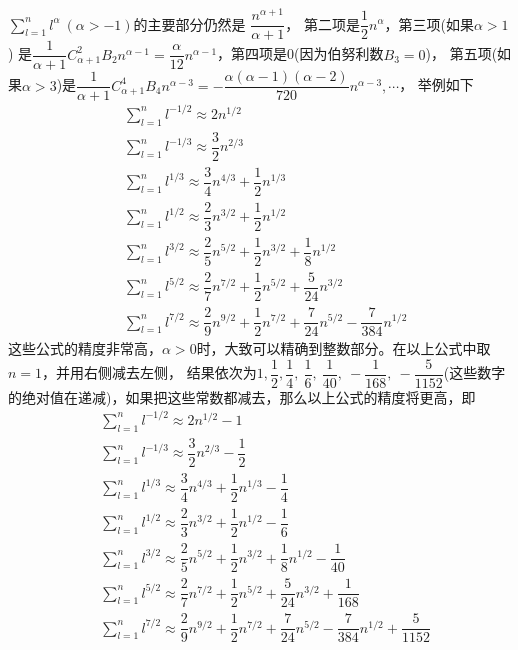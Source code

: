 \begin{itemize}[leftmargin=\inteval{\myitemleftmargin}pt,itemsep=
   \inteval{\myitemitempsep}pt,topsep=\inteval{\myitemtopsep}pt]
$ \sum\limits_{l=1}^{n} l^{\alpha}\ (\alpha>-1) $的主要部分仍然是
$ \dfrac{n^{\alpha+1}}{\alpha+1} $，
第二项是$ \dfrac{1}{2}n^{\alpha} $，第三项(如果$ \alpha>1 $)
是$ \dfrac{1}{\alpha+1}C_{\alpha+1}^2 B_2 n^{\alpha-1}=
\dfrac{\alpha}{12}n^{\alpha-1} $，第四项是0(因为伯努利数$ B_3=0 $)，
第五项(如果$ \alpha>3 $)是$ \dfrac{1}{\alpha+1}C_{\alpha+1}^4B_4n^{\alpha-3}
=-\dfrac{\alpha (\alpha-1)(\alpha-2)}{720}n^{\alpha-3},\cdots $，
举例如下
\begin{align*}
    &\sum\limits_{l=1}^{n} l^{-1/2}\approx 2n^{1/2}\\  
    &\sum\limits_{l=1}^{n} l^{-1/3}\approx \dfrac{3}{2}n^{2/3} \\   
    &\sum\limits_{l=1}^{n} l^{1/3}\approx \dfrac{3}{4}n^{4/3}+\dfrac{1}{2}n^{1/3} \\
    &\sum\limits_{l=1}^{n} l^{1/2}\approx \dfrac{2}{3}n^{3/2}+\dfrac{1}{2}n^{1/2} \\
    &\sum\limits_{l=1}^{n} l^{3/2}\approx \dfrac{2}{5}n^{5/2}+\dfrac{1}{2}n^{3/2}
    +\dfrac{1}{8}n^{1/2} \\
    &\sum\limits_{l=1}^{n} l^{5/2}\approx \dfrac{2}{7}n^{7/2}+\dfrac{1}{2}n^{5/2}
    +\dfrac{5}{24}n^{3/2} \\
    &\sum\limits_{l=1}^{n} l^{7/2}\approx \dfrac{2}{9}n^{9/2}+\dfrac{1}{2}n^{7/2}
    +\dfrac{7}{24}n^{5/2}-\dfrac{7}{384}n^{1/2} 
\end{align*}
这些公式的精度非常高，$ \alpha>0 $时，大致可以精确到整数部分。在以上公式中取$ n=1 $，并用右侧减去左侧，
结果依次为$ 1,\dfrac{1}{2},\dfrac{1}{4},\ \dfrac{1}{6},\ \dfrac{1}{40},\ -\dfrac{1}{168},
\ -\dfrac{5}{1152} $(这些数字的绝对值在递减)，如果把这些常数都减去，那么以上公式的精度将更高，即
\begin{align}
    &\sum\limits_{l=1}^{n} l^{-1/2}\approx 2n^{1/2}
    -1 \label{负二分之一次方求和}\\  
    &\sum\limits_{l=1}^{n} l^{-1/3}\approx \dfrac{3}{2}n^{2/3}-\dfrac{1}{2} 
    \label{负三分之一次方求和} \\     
    &\sum\limits_{l=1}^{n} l^{1/3}\approx \dfrac{3}{4}n^{4/3}
    +\dfrac{1}{2}n^{1/3}-\dfrac{1}{4} \label{三分之一次方求和}\\
    &\sum\limits_{l=1}^{n} l^{1/2}\approx \dfrac{2}{3}n^{3/2}
    +\dfrac{1}{2}n^{1/2}-\dfrac{1}{6} \label{0.5次方求和}\\
    &\sum\limits_{l=1}^{n} l^{3/2}\approx \dfrac{2}{5}n^{5/2}+\dfrac{1}{2}n^{3/2}
    +\dfrac{1}{8}n^{1/2}-\dfrac{1}{40} \label{1.5次方求和}\\
    &\sum\limits_{l=1}^{n} l^{5/2}\approx \dfrac{2}{7}n^{7/2}+\dfrac{1}{2}n^{5/2}
    +\dfrac{5}{24}n^{3/2}+\dfrac{1}{168} \label{2.5次方求和}\\
    &\sum\limits_{l=1}^{n} l^{7/2}\approx \dfrac{2}{9}n^{9/2}+\dfrac{1}{2}n^{7/2}
    +\dfrac{7}{24}n^{5/2}-\dfrac{7}{384}n^{1/2}+\dfrac{5}{1152}\label{3.5次方求和}
\end{align}


\end{itemize}
